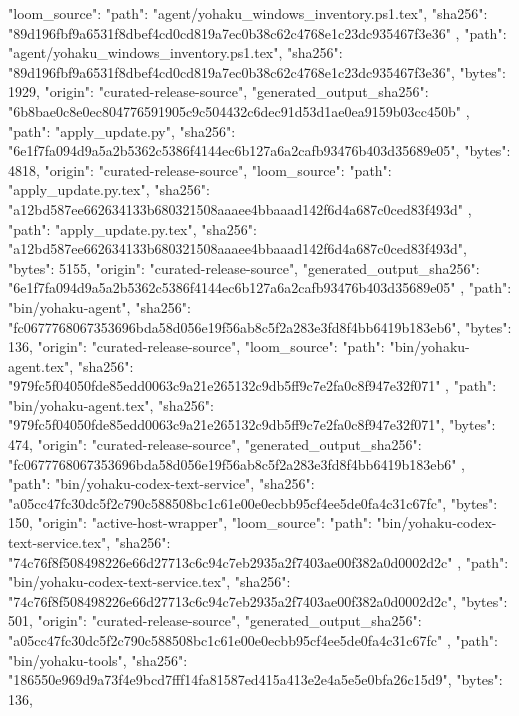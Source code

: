 {{      "loom_source": {
        "path": "agent/yohaku_windows_inventory.ps1.tex",
        "sha256": "89d196fbf9a6531f8dbef4cd0cd819a7ec0b38c62c4768e1c23dc935467f3e36"
      }
    },
    {
      "path": "agent/yohaku_windows_inventory.ps1.tex",
      "sha256": "89d196fbf9a6531f8dbef4cd0cd819a7ec0b38c62c4768e1c23dc935467f3e36",
      "bytes": 1929,
      "origin": "curated-release-source",
      "generated_output_sha256": "6b8bae0c8e0ec804776591905c9c504432c6dec91d53d1ae0ea9159b03cc450b"
    },
    {
      "path": "apply_update.py",
      "sha256": "6e1f7fa094d9a5a2b5362c5386f4144ec6b127a6a2cafb93476b403d35689e05",
      "bytes": 4818,
      "origin": "curated-release-source",
      "loom_source": {
        "path": "apply_update.py.tex",
        "sha256": "a12bd587ee662634133b680321508aaaee4bbaaad142f6d4a687c0ced83f493d"
      }
    },
    {
      "path": "apply_update.py.tex",
      "sha256": "a12bd587ee662634133b680321508aaaee4bbaaad142f6d4a687c0ced83f493d",
      "bytes": 5155,
      "origin": "curated-release-source",
      "generated_output_sha256": "6e1f7fa094d9a5a2b5362c5386f4144ec6b127a6a2cafb93476b403d35689e05"
    },
    {
      "path": "bin/yohaku-agent",
      "sha256": "fc0677768067353696bda58d056e19f56ab8c5f2a283e3fd8f4bb6419b183eb6",
      "bytes": 136,
      "origin": "curated-release-source",
      "loom_source": {
        "path": "bin/yohaku-agent.tex",
        "sha256": "979fc5f04050fde85edd0063c9a21e265132c9db5ff9c7e2fa0c8f947e32f071"
      }
    },
    {
      "path": "bin/yohaku-agent.tex",
      "sha256": "979fc5f04050fde85edd0063c9a21e265132c9db5ff9c7e2fa0c8f947e32f071",
      "bytes": 474,
      "origin": "curated-release-source",
      "generated_output_sha256": "fc0677768067353696bda58d056e19f56ab8c5f2a283e3fd8f4bb6419b183eb6"
    },
    {
      "path": "bin/yohaku-codex-text-service",
      "sha256": "a05cc47fc30dc5f2c790c588508bc1c61e00e0ecbb95cf4ee5de0fa4c31c67fc",
      "bytes": 150,
      "origin": "active-host-wrapper",
      "loom_source": {
        "path": "bin/yohaku-codex-text-service.tex",
        "sha256": "74c76f8f508498226e66d27713c6c94c7eb2935a2f7403ae00f382a0d0002d2c"
      }
    },
    {
      "path": "bin/yohaku-codex-text-service.tex",
      "sha256": "74c76f8f508498226e66d27713c6c94c7eb2935a2f7403ae00f382a0d0002d2c",
      "bytes": 501,
      "origin": "curated-release-source",
      "generated_output_sha256": "a05cc47fc30dc5f2c790c588508bc1c61e00e0ecbb95cf4ee5de0fa4c31c67fc"
    },
    {
      "path": "bin/yohaku-tools",
      "sha256": "186550e969d9a73f4e9bcd7fff14fa81587ed415a413e2e4a5e5e0bfa26c15d9",
      "bytes": 136,
}}
